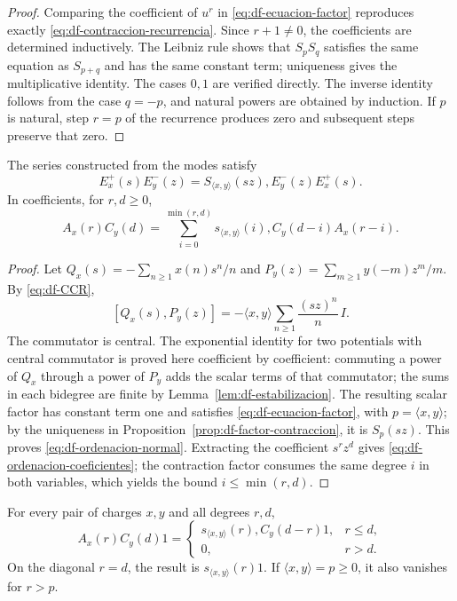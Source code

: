 \begin{proof}
Comparing the coefficient of \(u^r\) in \eqref{eq:df-ecuacion-factor} reproduces exactly \eqref{eq:df-contraccion-recurrencia}. Since \(r+1\ne0\), the coefficients are determined inductively. The Leibniz rule shows that \(S_pS_q\) satisfies the same equation as \(S_{p+q}\) and has the same constant term; uniqueness gives the multiplicative identity. The cases \(0,1\) are verified directly. The inverse identity follows from the case \(q=-p\), and natural powers are obtained by induction. If \(p\) is natural, step \(r=p\) of the recurrence produces zero and subsequent steps preserve that zero.
\end{proof}

\begin{theorem}
\label{thm:df-ordenacion} The series constructed from the modes satisfy
\begin{equation}
 E^+_x(s)E^-_y(z)
 =S_{\langle x,y\rangle}(sz),E^-_y(z)E^+_x(s).
 \label{eq:df-ordenacion-normal}
\end{equation}
In coefficients, for \(r,d\geq0\),
\begin{equation}
 A_x(r)C_y(d)
 =\sum_{i=0}^{\min(r,d)}
 s_{\langle x,y\rangle}(i),
 C_y(d-i)A_x(r-i).
 \label{eq:df-ordenacion-coeficientes}
\end{equation}
\end{theorem}

\begin{proof}
Let \(Q_x(s)=-\sum_{n\geq1}x(n)s^n/n\) and \(P_y(z)=\sum_{m\geq1}y(-m)z^m/m\). By \eqref{eq:df-CCR},
\[
 [Q_x(s),P_y(z)]
 =-\langle x,y\rangle\sum_{n\geq1}\frac{(sz)^n}{n}\,I.
\]
The commutator is central. The exponential identity for two potentials with central commutator is proved here coefficient by coefficient: commuting a power of \(Q_x\) through a power of \(P_y\) adds the scalar terms of that commutator; the sums in each bidegree are finite by Lemma~\ref{lem:df-estabilizacion}. The resulting scalar factor has constant term one and satisfies \eqref{eq:df-ecuacion-factor}, with \(p=\langle x,y\rangle\); by the uniqueness in Proposition~\ref{prop:df-factor-contraccion}, it is \(S_p(sz)\). This proves \eqref{eq:df-ordenacion-normal}. Extracting the coefficient \(s^rz^d\) gives \eqref{eq:df-ordenacion-coeficientes}; the contraction factor consumes the same degree \(i\) in both variables, which yields the bound \(i\leq\min(r,d)\).
\end{proof}

\begin{theorem}
\label{thm:df-contraccion-vacio} For every pair of charges \(x,y\) and all degrees \(r,d\),
\begin{equation}
 A_x(r)C_y(d)1=
 \begin{cases}
 s_{\langle x,y\rangle}(r),C_y(d-r)1,&r\leq d,\\
 0,&r>d.
 \end{cases}
 \label{eq:df-contraccion-vacio}
\end{equation}
On the diagonal \(r=d\), the result is \(s_{\langle x,y\rangle}(r)1\). If \(\langle x,y\rangle=p\geq0\), it also vanishes for \(r>p\).
\end{theorem}

